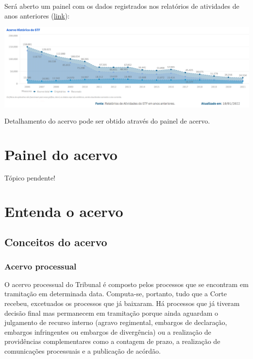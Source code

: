 \documentclass[
]{book}
\theoremstyle{definition}
\theoremstyle{definition}
\theoremstyle{definition}
\theoremstyle{definition}
\theoremstyle{remark}
\begin{document}
Será aberto um painel com os dados registrados nos relatórios de atividades de anos anteriores (\href{https://transparencia.stf.jus.br/single/?appid=e554950b-d244-487b-991d-abcc693bfa7c\&sheet=ea8942c2-79fa-494f-bf18-ca6d5a3bfb43\&theme=simplicity\&opt=currsel\&select=clearall}{link}):

\includegraphics[width=1\linewidth]{imagens/fig-cap4-2}

Detalhamento do acervo pode ser obtido através do painel de acervo.

\hypertarget{painel-do-acervo}{%
\section{Painel do acervo}\label{painel-do-acervo}}

Tópico pendente!

\hypertarget{entenda-o-acervo}{%
\section{Entenda o acervo}\label{entenda-o-acervo}}

\hypertarget{conceitos-do-acervo}{%
\subsection{Conceitos do acervo}\label{conceitos-do-acervo}}

\hypertarget{acervo-processual}{%
\subsubsection{Acervo processual}\label{acervo-processual}}

O acervo processual do Tribunal é composto pelos processos que se encontram em tramitação em determinada data. Computa-se, portanto, tudo que a Corte recebeu, excetuados os processos que já baixaram.
Há processos que já tiveram decisão final mas permanecem em tramitação porque ainda aguardam o julgamento de recurso interno (agravo regimental, embargos de declaração, embargos infringentes ou embargos de divergência) ou a realização de providências complementares como a contagem de prazo, a realização de comunicações processuais e a publicação de acórdão.
\end{document}

